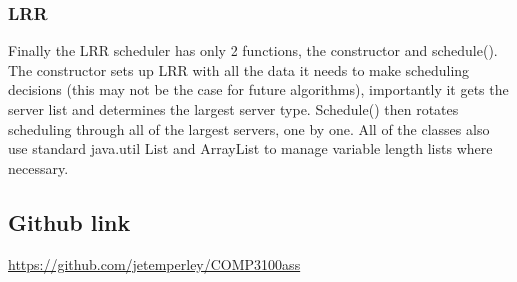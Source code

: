 \documentclass[a4paper]{article} %
\begin{document}
\subsubsection{LRR}
Finally the LRR scheduler has only 2 functions, the constructor and schedule(). The constructor sets up LRR with all the data it needs to make scheduling decisions (this may not be the case for future algorithms), importantly it gets the server list and determines the largest server type. Schedule() then rotates scheduling through all of the largest servers, one by one.
All of the classes also use standard java.util List and ArrayList to manage variable length lists where necessary.


\subsection{Github link}
\url{https://github.com/jetemperley/COMP3100ass}


\end{document}
